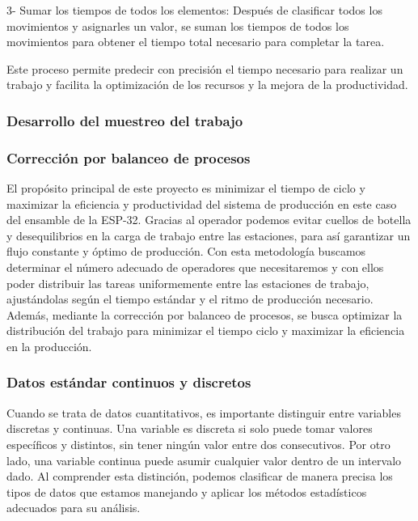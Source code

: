     3- Sumar los tiempos de todos los elementos: Después de clasificar todos los movimientos y asignarles un valor, se suman los tiempos de todos los movimientos para obtener el tiempo total necesario para completar la tarea.
    
    Este proceso permite predecir con precisión el tiempo necesario para realizar un trabajo y facilita la optimización de los recursos y la mejora de la productividad.
    
    
    
    
    
    
    
    \subsubsection{Desarrollo del muestreo del trabajo}
    
    
    \subsubsection{Corrección por balanceo de procesos}
    El propósito principal de este proyecto es minimizar el tiempo de ciclo y maximizar la eficiencia y productividad del sistema de producción en este caso del ensamble de la ESP-32. Gracias al operador podemos evitar cuellos de botella y desequilibrios en la carga de trabajo entre las estaciones, para así garantizar un flujo constante y óptimo de producción. Con esta metodología buscamos determinar el número adecuado de operadores que necesitaremos y con ellos poder distribuir las tareas uniformemente entre las estaciones de trabajo, ajustándolas según el tiempo estándar y el ritmo de producción necesario. Además, mediante la corrección por balanceo de procesos, se busca optimizar la distribución del trabajo para minimizar el tiempo ciclo y maximizar la eficiencia en la producción.
    \subsubsection{Datos estándar continuos y discretos}
    Cuando se trata de datos cuantitativos, es importante distinguir entre variables discretas y continuas. Una variable es discreta si solo puede tomar valores específicos y distintos, sin tener ningún valor entre dos consecutivos. Por otro lado, una variable continua puede asumir cualquier valor dentro de un intervalo dado. Al comprender esta distinción, podemos clasificar de manera precisa los tipos de datos que estamos manejando y aplicar los métodos estadísticos adecuados para su análisis. \cite{Datoscontinuosydiscretos}
